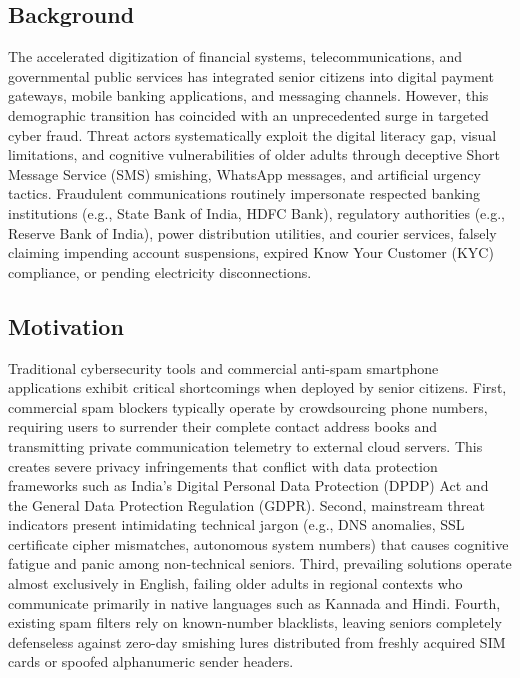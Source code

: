 \documentclass[conference]{IEEEtran}
\begin{document}
\subsection{Background}
The accelerated digitization of financial systems, telecommunications, and governmental public services has integrated senior citizens into digital payment gateways, mobile banking applications, and messaging channels. However, this demographic transition has coincided with an unprecedented surge in targeted cyber fraud. Threat actors systematically exploit the digital literacy gap, visual limitations, and cognitive vulnerabilities of older adults through deceptive Short Message Service (SMS) smishing, WhatsApp messages, and artificial urgency tactics. Fraudulent communications routinely impersonate respected banking institutions (e.g., State Bank of India, HDFC Bank), regulatory authorities (e.g., Reserve Bank of India), power distribution utilities, and courier services, falsely claiming impending account suspensions, expired Know Your Customer (KYC) compliance, or pending electricity disconnections.

\subsection{Motivation}
Traditional cybersecurity tools and commercial anti-spam smartphone applications exhibit critical shortcomings when deployed by senior citizens. First, commercial spam blockers typically operate by crowdsourcing phone numbers, requiring users to surrender their complete contact address books and transmitting private communication telemetry to external cloud servers. This creates severe privacy infringements that conflict with data protection frameworks such as India's Digital Personal Data Protection (DPDP) Act and the General Data Protection Regulation (GDPR). Second, mainstream threat indicators present intimidating technical jargon (e.g., DNS anomalies, SSL certificate cipher mismatches, autonomous system numbers) that causes cognitive fatigue and panic among non-technical seniors. Third, prevailing solutions operate almost exclusively in English, failing older adults in regional contexts who communicate primarily in native languages such as Kannada and Hindi. Fourth, existing spam filters rely on known-number blacklists, leaving seniors completely defenseless against zero-day smishing lures distributed from freshly acquired SIM cards or spoofed alphanumeric sender headers.
\end{document}
